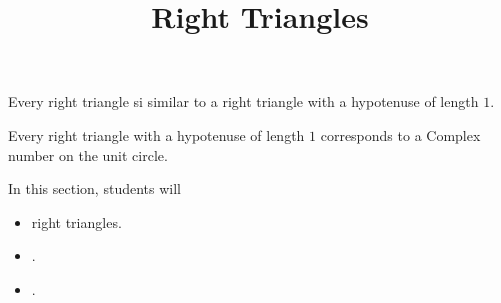 \documentclass{ximera}
\title{Right Triangles}
\begin{document}
\begin{abstract}
\end{abstract}
\maketitle


Every right triangle si similar to a right triangle with a hypotenuse of length $1$.


Every right triangle with a hypotenuse of length $1$ corresponds to a Complex number on the unit circle.


\begin{sectionOutcomes}
In this section, students will 

\begin{itemize}
\item right triangles.
\item .
\item .
\end{itemize}
\end{sectionOutcomes}
\end{document}
